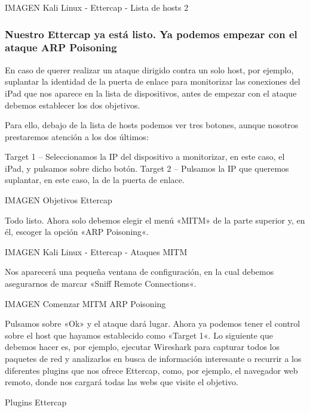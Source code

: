 IMAGEN Kali Linux - Ettercap - Lista de hosts 2

\subsubsection{Nuestro Ettercap ya está listo. Ya podemos empezar con el ataque ARP Poisoning}

En caso de querer realizar un ataque dirigido contra un solo host, por ejemplo, suplantar la identidad de la puerta de enlace para monitorizar las conexiones del iPad que nos aparece en la lista de dispositivos, antes de empezar con el ataque debemos establecer los dos objetivos.

Para ello, debajo de la lista de hosts podemos ver tres botones, aunque nosotros prestaremos atención a los dos últimos:

    Target 1 – Seleccionamos la IP del dispositivo a monitorizar, en este caso, el iPad, y pulsamos sobre dicho botón.
    Target 2 – Pulsamos la IP que queremos suplantar, en este caso, la de la puerta de enlace.

IMAGEN Objetivos Ettercap

Todo listo. Ahora solo debemos elegir el menú «MITM» de la parte superior y, en él, escoger la opción «ARP Poisoning«.

IMAGEN Kali Linux - Ettercap - Ataques MITM

Nos aparecerá una pequeña ventana de configuración, en la cual debemos asegurarnos de marcar «Sniff Remote Connections«.

IMAGEN Comenzar MITM ARP Poisoning

Pulsamos sobre «Ok» y el ataque dará lugar. Ahora ya podemos tener el control sobre el host que hayamos establecido como «Target 1«. Lo siguiente que debemos hacer es, por ejemplo, ejecutar Wireshark para capturar todos los paquetes de red y analizarlos en busca de información interesante o recurrir a los diferentes plugins que nos ofrece Ettercap, como, por ejemplo, el navegador web remoto, donde nos cargará todas las webs que visite el objetivo.

Plugins Ettercap
